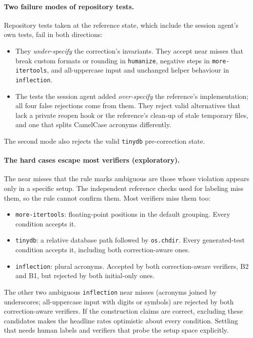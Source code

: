 \paragraph{Two failure modes of repository tests.} Repository tests taken at the reference state, which include the session agent's own tests, fail in both directions:
\begin{itemize}
\item They \emph{under-specify} the correction's invariants. They accept near misses that break custom formats or rounding in \texttt{humanize}, negative steps in \texttt{more-itertools}, and all-uppercase input and unchanged helper behaviour in \texttt{inflection}.
\item The tests the session agent added \emph{over-specify} the reference's implementation; all four false rejections come from them. They reject valid alternatives that lack a private reopen hook or the reference's clean-up of stale temporary files, and one that splits CamelCase acronyms differently.
\end{itemize}
The second mode also rejects the valid \texttt{tinydb} pre-correction state.

\paragraph{The hard cases escape most verifiers (exploratory).} The near misses that the rule marks ambiguous are those whose violation appears only in a specific setup. The independent reference checks used for labeling miss them, so the rule cannot confirm them. Most verifiers miss them too:
\begin{itemize}
\item \texttt{more-itertools}: floating-point positions in the default grouping. Every condition accepts it.
\item \texttt{tinydb}: a relative database path followed by \texttt{os.chdir}. Every generated-test condition accepts it, including both correction-aware ones.
\item \texttt{inflection}: plural acronyms. Accepted by both correction-aware verifiers, B2 and B1, but rejected by both initial-only ones.
\end{itemize}
The other two ambiguous \texttt{inflection} near misses (acronyms joined by underscores; all-uppercase input with digits or symbols) are rejected by both correction-aware verifiers. If the construction claims are correct, excluding these candidates makes the headline rates optimistic about every condition. Settling that needs human labels and verifiers that probe the setup space explicitly.
